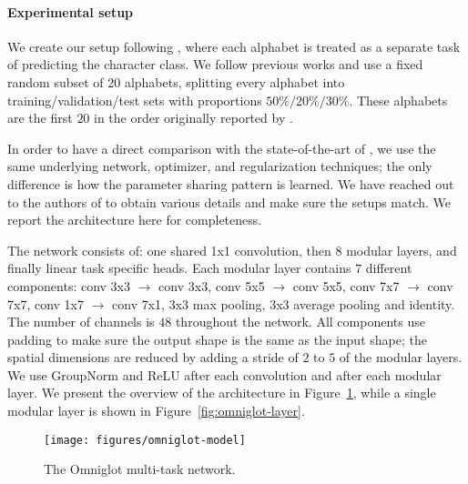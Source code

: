 \documentclass[conference]{IEEEtran}
\begin{document}
\paragraph{Experimental setup}

We create our setup following \cite{MeyerMiikk-ICLR-2018}, where each alphabet is treated as a separate task of predicting the character class. We follow previous works \cite{Liang-2018, Diversity&Depth-ICLR-2019} and use a fixed random subset of $20$ alphabets, splitting every alphabet into training/validation/test sets with proportions $50\%/20\%/30\%$. These alphabets are the first $20$ in the order originally reported by \cite{MeyerMiikk-ICLR-2018}.

In order to have a direct comparison with the state-of-the-art of \cite{Diversity&Depth-ICLR-2019}, we use the same underlying network, optimizer, and regularization techniques; the only difference is how the parameter sharing pattern is learned. We have reached out to the authors of \cite{Diversity&Depth-ICLR-2019} to obtain various details and make sure the setups match. We report the architecture here for completeness.

The network consists of: one shared 1x1 convolution, then $8$ modular layers, and finally linear task specific heads. Each modular layer contains $7$ different components: conv 3x3 $\rightarrow$ conv 3x3, conv 5x5 $\rightarrow$ conv 5x5, conv 7x7 $\rightarrow$ conv 7x7, conv 1x7 $\rightarrow$ conv 7x1, 3x3 max pooling, 3x3 average pooling and identity. The number of channels is $48$ throughout the network. All components use padding to make sure the output shape is the same as the input shape; the spatial dimensions are reduced by adding a stride of $2$ to $5$ of the modular layers. We use GroupNorm \cite{GroupNorm} and ReLU after each convolution and after each modular layer. We present the overview of the architecture in Figure~\ref{fig:omniglot-model}, while a single modular layer is shown in Figure~\ref{fig:omniglot-layer}.

\begin{figure}[t]
\begin{center}
\texttt{[image: figures/omniglot-model]}
\end{center}
\caption{The Omniglot multi-task network.}\label{fig:omniglot-model}
\end{figure}
\end{document}
